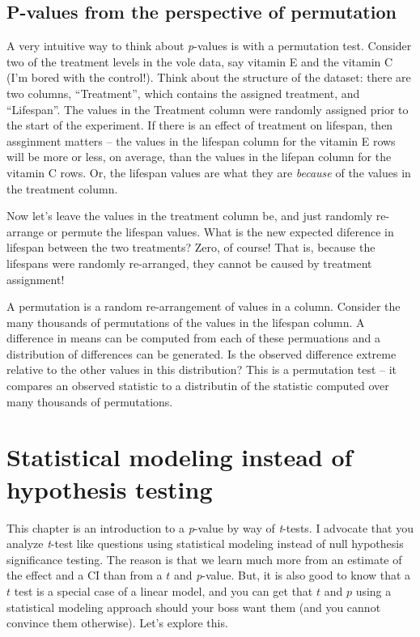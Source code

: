 \documentclass[]{book}
\begin{document}
\subsection{P-values from the perspective of
permutation}\label{p-values-from-the-perspective-of-permutation}

A very intuitive way to think about \emph{p}-values is with a
permutation test. Consider two of the treatment levels in the vole data,
say vitamin E and the vitamin C (I'm bored with the control!). Think
about the structure of the dataset: there are two columns,
``Treatment'', which contains the assigned treatment, and ``Lifespan''.
The values in the Treatment column were randomly assigned prior to the
start of the experiment. If there is an effect of treatment on lifespan,
then assginment matters -- the values in the lifespan column for the
vitamin E rows will be more or less, on average, than the values in the
lifepan column for the vitamin C rows. Or, the lifespan values are what
they are \emph{because} of the values in the treatment column.

Now let's leave the values in the treatment column be, and just randomly
re-arrange or permute the lifespan values. What is the new expected
diference in lifespan between the two treatments? Zero, of course! That
is, because the lifespans were randomly re-arranged, they cannot be
caused by treatment assignment!

A permutation is a random re-arrangement of values in a column. Consider
the many thousands of permutations of the values in the lifespan column.
A difference in means can be computed from each of these permuations and
a distribution of differences can be generated. Is the observed
difference extreme relative to the other values in this distribution?
This is a permutation test -- it compares an observed statistic to a
distributin of the statistic computed over many thousands of
permutations.

\section{Statistical modeling instead of hypothesis
testing}\label{statistical-modeling-instead-of-hypothesis-testing}

This chapter is an introduction to a \emph{p}-value by way of
\emph{t}-tests. I advocate that you analyze \emph{t}-test like questions
using statistical modeling instead of null hypothesis significance
testing. The reason is that we learn much more from an estimate of the
effect and a CI than from a \(t\) and \emph{p}-value. But, it is also
good to know that a \(t\) test is a special case of a linear model, and
you can get that \(t\) and \(p\) using a statistical modeling approach
should your boss want them (and you cannot convince them otherwise).
Let's explore this.
\end{document}
